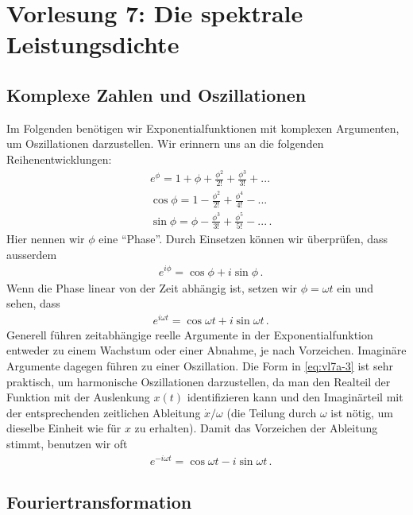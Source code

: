 \section{Vorlesung 7: Die spektrale Leistungsdichte}
\label{sec:vl7}


\subsection{Komplexe Zahlen und Oszillationen}
\label{subsec:vl7a}

Im Folgenden benötigen wir Exponentialfunktionen mit komplexen Argumenten, um Oszillationen darzustellen. Wir erinnern uns an die folgenden Reihenentwicklungen:
\begin{align}
&e^{\phi} = 1 + \phi + \frac{\phi^2}{2!} + \frac{\phi^3}{3!} + ... \nonumber\\
&\cos{\phi} = 1 - \frac{\phi^2}{2!} + \frac{\phi^4}{4!} - ...\nonumber\\
&\sin{\phi} = \phi - \frac{\phi^3}{3!} + \frac{\phi^5}{5!} - ...\,.
\label{eq:vl7a-1}
\end{align}
Hier nennen wir $\phi$ eine ``Phase''. Durch Einsetzen können wir überprüfen, dass ausserdem
\begin{align}
&e^{i\phi} = \cos{\phi} +i\sin{\phi}\,.
\label{eq:vl7a-2}
\end{align}
Wenn die Phase linear von der Zeit abhängig ist, setzen wir $\phi = \omega t$ ein und sehen, dass
\begin{align}
&e^{i\omega t} = \cos{\omega t} +i\sin{\omega t}\,.
\label{eq:vl7a-3}
\end{align}
Generell führen zeitabhängige reelle Argumente in der Exponentialfunktion entweder zu einem Wachstum oder einer Abnahme, je nach Vorzeichen. Imaginäre Argumente dagegen führen zu einer Oszillation. Die Form in \cref{eq:vl7a-3} ist sehr praktisch, um harmonische Oszillationen darzustellen, da man den Realteil der Funktion mit der Auslenkung $x(t)$ identifizieren kann und den Imaginärteil mit der entsprechenden zeitlichen Ableitung $\dot{x}/\omega$ (die Teilung durch $\omega$ ist nötig, um dieselbe Einheit wie für $x$ zu erhalten). Damit das Vorzeichen der Ableitung stimmt, benutzen wir oft
\begin{align}
&e^{-i\omega t} = \cos{\omega t} -i\sin{\omega t}\,.
\label{eq:vl7a-4}
\end{align}

\subsection{Fouriertransformation}
\label{subsec:vl7}

